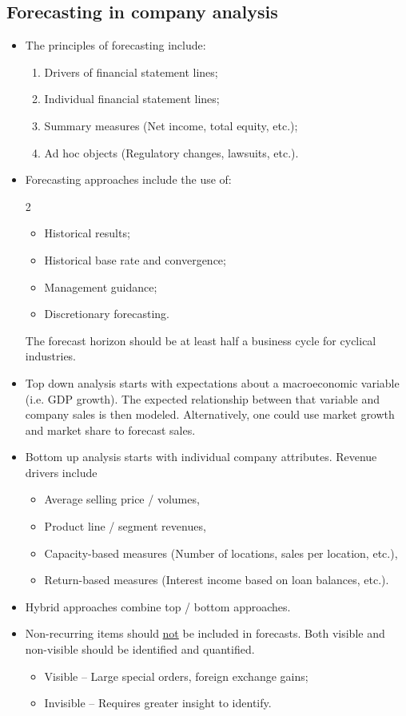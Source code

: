 \documentclass[../notes_compiled.tex]{subfiles}
\begin{document}
\subsection{Forecasting in company analysis}
\begin{itemize}
\item The principles of forecasting include:
\begin{enumerate}
\item Drivers of financial statement lines;
\item Individual financial statement lines;
\item Summary measures (Net income, total equity, etc.);
\item Ad hoc objects (Regulatory changes, lawsuits, etc.).
\end{enumerate}
\item Forecasting approaches include the use of:
\begin{multicols}{2}
\begin{itemize}
\item Historical results;
\item Historical base rate and convergence;
\item Management guidance;
\item Discretionary forecasting.
\end{itemize}
\end{multicols}
The forecast horizon should be at least half a business cycle for cyclical industries.
\item Top down analysis starts with expectations about a macroeconomic variable (i.e. GDP growth). The expected relationship between that variable and company sales is then modeled. Alternatively, one could use market growth and market share to forecast sales.
\item Bottom up analysis starts with individual company attributes. Revenue drivers include
\begin{itemize}
\item Average selling price / volumes,
\item Product line / segment revenues,
\item Capacity-based measures (Number of locations, sales per location, etc.),
\item Return-based measures (Interest income based on loan balances, etc.).
\end{itemize}
\item Hybrid approaches combine top / bottom approaches.
\item Non-recurring items should \underline{not} be included in forecasts. Both visible and non-visible should be identified and quantified.
\begin{itemize}
\item Visible -- Large special orders, foreign exchange gains;
\item Invisible -- Requires greater insight to identify.
\end{itemize}
\end{itemize}
\end{document}
